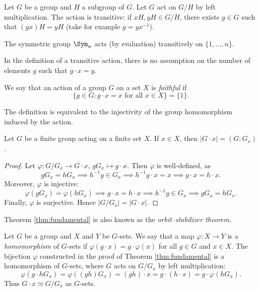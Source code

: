 \begin{example}
    Let $G$ be a group and $H$ a subgroup of $G$. Let $G$ act
    on $G/H$ by left multiplication. The action is transitive: if 
    $xH,yH\in G/H$, there exists $g\in G$ such that
    $(gx)H=yH$ (take for example $g=yx^{-1}$). 
\end{example}

\begin{example}
The symmetric group $\Sym_n$ acts (by evaluation) transitively 
on $\{1,\dots,n\}$.
\end{example}

In the definition of a transitive action, there is no assumption
on the number of elements $g$ such that $g\cdot x=y$.

\begin{definition}
We say that an action of a group $G$ on a set 
$X$ is \emph{faithful} if 
\[
\{g\in G:g\cdot x=x\text{ for all $x\in X$}\}=\{1\}.
\]
\end{definition}

The definition is equivalent to the injectivity of 
the group homomorphism induced
by the action. 

\begin{theorem}
\label{thm:fundamental}
Let $G$ be a finite group acting on a finite set $X$. If 
$x\in X$, then $|G\cdot x|=(G:G_x)$.
\end{theorem}

\begin{proof}
    Let $\varphi\colon G/G_x\to G\cdot x$, $gG_x\mapsto g\cdot x$. Then $\varphi$ is well-defined, as 
        \[
        gG_x=hG_x\implies h^{-1}g\in G_x
        \implies h^{-1}g\cdot x=x\implies g\cdot x=h\cdot x.
        \]
    Moreover, $\varphi$ is injective: 
        \[
        \varphi(gG_x)=\varphi(hG_x)\implies
        g\cdot x=h\cdot x\implies
        h^{-1}g\in G_x\implies gG_x=hG_x.
        \]
    Finally, $\varphi$ is surjective. Hence 
    $|G/G_x|=|G\cdot x|$.
\end{proof}

Theorem \ref{thm:fundamental} is also known 
as the \emph{orbit--stabilizer theorem}. 

\begin{optional}
Let $G$ be a group and $X$ and $Y$ be $G$-sets. 
We say that a map $\varphi\colon X\to Y$ is a 
\emph{homomorphism} of $G$-sets if $\varphi(g\cdot x)=g\cdot \varphi(x)$ for all $g\in G$ and $x\in X$. The bijection 
$\varphi$ constructed in the proof of Theorem \ref{thm:fundamental}
is a homomorphism of $G$-sets, where
$G$ acts on $G/G_x$ by left multiplication: 
\[
\varphi(g\cdot hG_x)=\varphi((gh)G_x)=(gh)\cdot x=g\cdot (h\cdot x)=g\cdot\varphi(hG_x).
\]
Thus $G\cdot x\simeq G/G_x$ as $G$-sets.
\end{optional}

